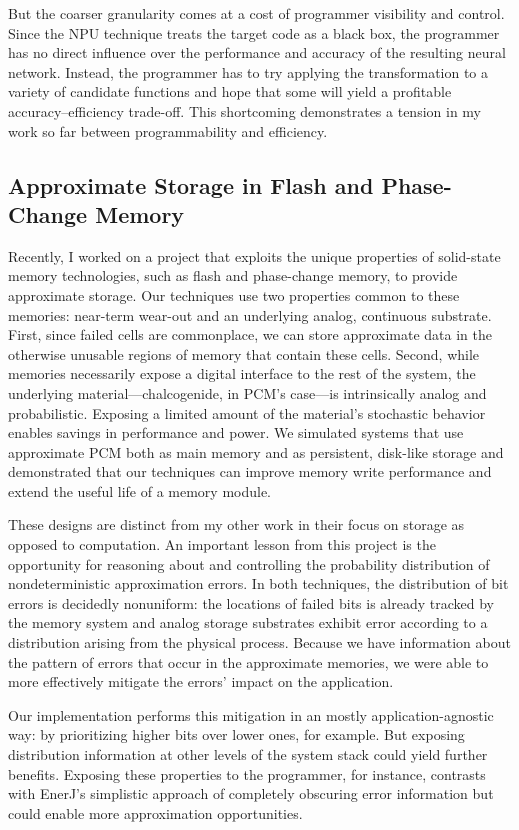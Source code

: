 But the coarser granularity comes at a cost of programmer visibility and
control. Since the NPU technique treats the target code as a black box, the
programmer has no direct influence over the performance and accuracy of the
resulting neural network. Instead, the programmer has to try applying the
transformation to a variety of candidate functions and hope that some will
yield a profitable accuracy--efficiency trade-off.
This shortcoming demonstrates a tension in my work so far between
programmability and efficiency.

\subsection{Approximate Storage in Flash and Phase-Change Memory}

Recently, I worked on a project that exploits the unique properties of
solid-state memory technologies, such as flash and phase-change memory,
to provide approximate storage. Our techniques use two properties common to these memories:
near-term wear-out and an underlying analog, continuous substrate. First, since
failed cells are commonplace, we can store approximate data in the otherwise
unusable regions of memory that contain these cells. Second, while memories
necessarily expose a digital interface to the rest of the system, the
underlying material---chalcogenide, in PCM's case---is intrinsically analog
and probabilistic. Exposing a limited amount of the material's stochastic
behavior enables savings in performance and power.
We simulated systems that use approximate PCM both as main memory and as
persistent, disk-like storage and demonstrated that our techniques can improve
memory write performance and extend the useful life of a memory module.

These designs are distinct from my other work in their focus on storage as
opposed to computation. An important lesson from this project is the
opportunity for reasoning about and controlling the probability distribution
of nondeterministic approximation errors. In both techniques, the distribution
of bit errors is decidedly nonuniform: the locations of failed bits is already
tracked by the memory system and analog storage substrates exhibit error
according to a distribution arising from the physical process. Because we have
information about the pattern of errors that occur in the approximate
memories, we were able to more effectively mitigate the errors' impact on the
application.

Our implementation performs this mitigation in an mostly application-agnostic
way: by prioritizing higher bits over lower ones, for example. But exposing
distribution information at other levels of the system stack could yield
further benefits. Exposing these properties to the programmer, for instance,
contrasts with EnerJ's simplistic approach of completely obscuring error
information but could enable more approximation opportunities.

